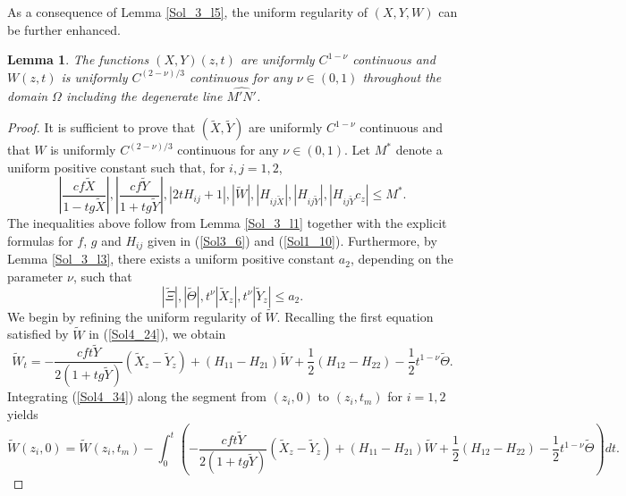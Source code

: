 \documentclass[3p,11pt]{elsarticle}
\numberwithin{equation}{section}
\newtheorem{lemma}{Lemma}[section]
\begin{document}
As a consequence of Lemma \ref{Sol_3_l5}, the uniform regularity of $( X, Y,W)$ can be further enhanced.
\begin{lemma}\label{Sol_3_l6}
    The functions $( X, Y)(z,t)$ are uniformly $C^{1-\nu}$ continuous and $W(z,t)$ is uniformly $C^{(2-\nu)/3}$ continuous for any $\nu\in(0,1)$ throughout the domain $\Omega$ including the degenerate line $\widehat{M'N'}$.
\end{lemma}
 \begin{proof}
     It is sufficient to prove that $(\widetilde X, \widetilde Y)$ are uniformly $C^{1-\nu}$ continuous and that $W$ is uniformly $C^{(2-\nu)/3}$ continuous for any $\nu\in(0,1)$. Let $M^{\ast}$ denote a uniform positive constant such that, for $i,j=1,2$,
     \begin{equation}\label{Sol4_32}
         \left | \frac{cf\widetilde X}{1-tg\widetilde X}\right|, \left | \frac{cf\widetilde Y}{1+tg\widetilde Y}\right|, |2tH_{ij}+1|, |\widetilde W|, |H_{ij\widetilde X}|, |H_{ij\widetilde Y}|,|H_{ij\widetilde Y}c_z|\leq M^*.
     \end{equation}
     The inequalities above follow from Lemma \ref{Sol_3_l1} together with the explicit formulas for $f$, $g$ and $H_{ij}$ given in (\ref{Sol3_6}) and (\ref{Sol1_10}). Furthermore, by Lemma \ref{Sol_3_l3}, there exists a uniform positive constant $a_{2}$, depending on the parameter $\nu$, such that
     \begin{equation}\label{Sol4_33}
         |\widetilde\Xi|, |\widetilde\Theta|, t^\nu|\widetilde X_z|, t^\nu|\widetilde Y_z|\leq a_2.
     \end{equation}
     We begin by refining the uniform regularity of $\widetilde W$. Recalling the first equation satisfied by $\widetilde W$ in (\ref{Sol4_24}), we obtain
     \begin{equation}\label{Sol4_34}
         \widetilde W_t=-\frac{cft\widetilde Y}{2(1+tg\widetilde Y)}(\widetilde X_z-\widetilde Y_z) +(H_{11}-H_{21})\widetilde W+\frac{1}{2}(H_{12}-H_{22})-\frac{1}{2}t^{1-\nu}\widetilde \Theta.
     \end{equation}
     Integrating (\ref{Sol4_34}) along the segment from $(z_{i},0)$ to $(z_{i},t_{m})$ for $i=1,2$ yields
     \begin{equation}\label{Sol4_35}
          \widetilde W(z_i,0)=\widetilde W(z_i,t_m)-\int_0^t\left(-\frac{cft\widetilde Y}{2(1+tg\widetilde Y)}(\widetilde X_z-\widetilde Y_z) +(H_{11}-H_{21})\widetilde W+\frac{1}{2}(H_{12}-H_{22})-\frac{1}{2}t^{1-\nu}\widetilde \Theta \right)dt.
     \end{equation}

\end{proof}
\end{document}
